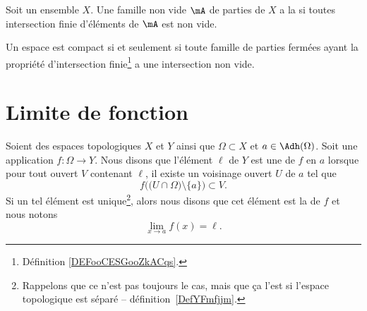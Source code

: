 \begin{definition}      \label{DEFooCESGooZkACqs}
	Soit un ensemble \( X\). Une famille non vide \( \mA\) de parties de \( X\) a la  si toutes intersection finie d'éléments de \( \mA\) est non vide.
\end{definition}

\begin{theorem}       \label{THOooCQSQooDuasqo}
	Un espace est compact si et seulement si toute famille de parties fermées ayant la propriété d'intersection finie\footnote{Définition \ref{DEFooCESGooZkACqs}.} a une intersection non vide.
\end{theorem}

\section{Limite de fonction}

\begin{definition}\label{DefYNVoWBx}
	Soient des espaces topologiques \( X\) et \( Y\) ainsi que \( \Omega\subset X\) et \( a\in \Adh(\Omega)\). Soit une application \( f\colon \Omega\to Y\). Nous disons que l'élément \( \ell\) de \( Y\) est une  de \( f\) en \( a\) lorsque pour tout ouvert \( V\) contenant \( \ell\), il existe un voisinage ouvert \( U\) de \( a\) tel que
	\begin{equation}        \label{EQooXLJJooZDcOtU}
		f\Big( \big( U\cap\Omega\big)\setminus\{ a \} \Big)\subset V.
	\end{equation}
	Si un tel élément est unique\footnote{Rappelons que ce n'est pas toujours le cas, mais que ça l'est si l'espace topologique est séparé -- définition~\ref{DefYFmfjjm}.}, alors nous disons que cet élément est la  de \( f\) et nous notons
	\begin{equation}
		\lim_{x\to a} f(x)=\ell.
	\end{equation}
\end{definition}

